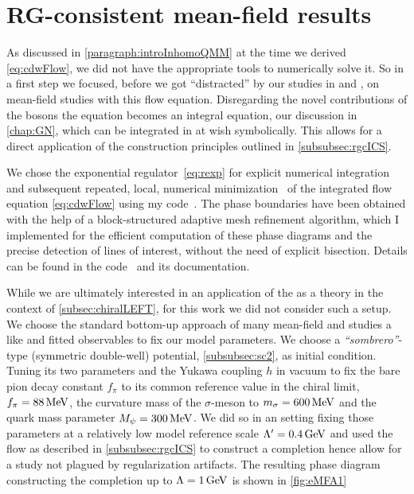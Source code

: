 \section{RG-consistent mean-field results}\label{sec:cdwmf}
As discussed in \cref{paragraph:introInhomoQMM} at the time we derived \cref{eq:cdwFlow}, we did not have the appropriate tools to numerically solve it. So in a first step we focused, before we got ``distracted'' by our studies in \dzero{} and \dtwo{}, on mean-field studies with this flow equation. Disregarding the novel contributions of the bosons the equation becomes an integral equation, \cf{} our discussion in \cref{chap:GN}, which can be integrated in \rgscale{} at wish symbolically. This allows for a direct application of the construction principles outlined in \cref{subsubsec:rgcICS}.

We chose the exponential regulator~\eqref{eq:rexp} for explicit numerical integration~\cite{cubature:2020} and subsequent repeated, local, numerical minimization~\cite{Nelder:1965} of the integrated flow equation \cref{eq:cdwFlow} using my \Cpp{} code~\cite{Steil:2023QMcpp}.
The phase boundaries have been obtained with the help of a block-structured adaptive mesh refinement algorithm, which I implemented for the efficient computation of these phase diagrams and the precise detection of lines of interest, without the need of explicit bisection. Details can be found in the \Cpp{} code~\cite{Steil:2023QMcpp} and its documentation.

While we are ultimately interested in an application of the \qmm{} as a \loeft{} theory in the context of \cref{subsec:chiralLEFT}, for this work we did not consider such a setup. We choose the standard bottom-up approach of many mean-field and \frg{} studies a like and fitted \ir{} observables to fix our model parameters. We choose a \textit{``sombrero''}-type (symmetric double-well) potential, \cf{} \cref{subsubsec:sc2}, as initial condition. Tuning its two parameters and the Yukawa coupling $h$ in vacuum to fix the bare pion decay constant $f_\pi$ to its common reference value in the chiral limit, \viz{} $f_\pi=88\,\mathrm{MeV}$, the curvature mass of the $\sigma$-meson to $m_\sigma=600\, \mathrm{MeV}$ and the quark mass parameter $M_\psi=300\,\mathrm{MeV}$.
We did so in an \rgct{} setting fixing those parameters at a relatively low model reference scale $\Lambda'=0.4\,\mathrm{GeV}$ and used the \frg{} flow as described in \cref{subsubsec:rgcICS} to construct a \uv{} completion \dash{} hence allow for a study not plagued by regularization artifacts. The resulting phase diagram constructing the completion up to $\Lambda=1\, \mathrm{GeV}$ is shown in \cref	{fig:eMFA1}

